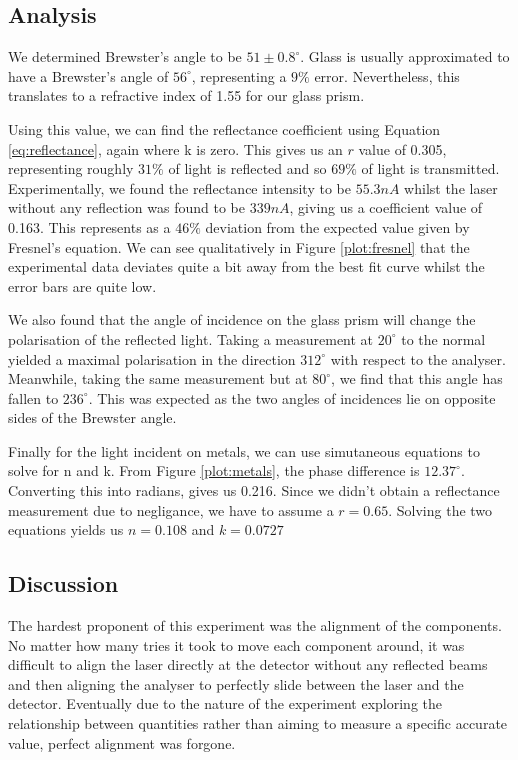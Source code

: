 \documentclass{article}
\begin{document}
\subsection{Analysis}
We determined Brewster's angle to be $51 \pm 0.8^\circ$. Glass is 
usually approximated to have a Brewster's angle of $56^\circ$, 
representing a $9\%$ error. Nevertheless, this translates to a 
refractive index of 1.55 for our glass prism. 

Using this value, 
we can find the reflectance coefficient using Equation \ref{eq:reflectance},
again where k is zero. This gives us an $r$ value of 0.305, representing 
roughly $31\%$ of light is reflected and so $69\%$ of light is 
transmitted. Experimentally, we found the reflectance intensity 
to be $55.3nA$ whilst the laser without any reflection was found to be 
$339nA$, giving us a coefficient value of 0.163. This represents as 
a $46\%$ deviation from the expected value given by Fresnel's equation.
We can see qualitatively in Figure \ref{plot:fresnel} that the 
experimental data deviates quite a bit away from the best fit curve 
whilst the error bars are quite low.

We also found that the angle of incidence on the glass prism will 
change the polarisation of the reflected light. Taking a measurement 
at $20^\circ$ to the normal yielded a maximal polarisation in the 
direction $312^\circ$ with respect to the analyser. Meanwhile, 
taking the same measurement but at $80^\circ$, we find that this 
angle has fallen to $236^\circ$. This was expected as the two angles 
of incidences lie on opposite sides of the Brewster angle.

Finally for the light incident on metals, we can use simutaneous 
equations to solve for n and k. From Figure \ref{plot:metals}, the 
phase difference is $12.37^\circ$. Converting this into radians,
gives us 0.216. Since we didn't obtain a reflectance measurement due 
to negligance, we have to assume a $r=0.65$. Solving the two equations
yields us $n=0.108$ and $k = 0.0727$

\subsection{Discussion}
The hardest proponent of this experiment was the alignment of the 
components. No matter how many tries it took to move each component 
around, it was difficult to align the laser directly at the detector 
without any reflected beams and then aligning the analyser to perfectly 
slide between the laser and the detector. Eventually due to the nature 
of the experiment exploring the relationship between quantities rather 
than aiming to measure a specific accurate value, perfect alignment was 
forgone.
\end{document}
